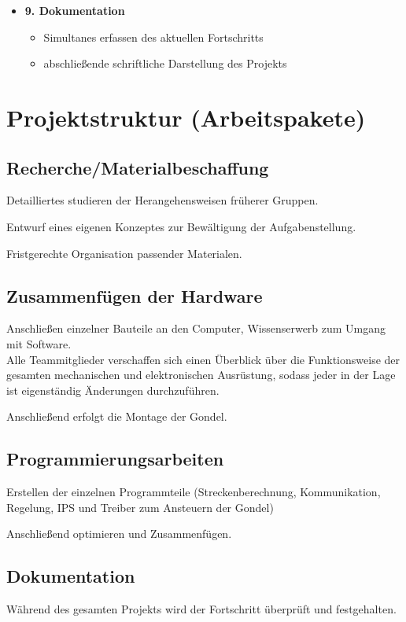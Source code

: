 \documentclass[lang=ngerman,inputenc=utf8,fontsize=10pt]{ldvarticle}
\begin{document}
\begin{itemize}
\begin{itemize}
\end{itemize}
\item \textbf{9. Dokumentation}
\begin{itemize}
\item Simultanes erfassen des aktuellen Fortschritts
\item abschließende schriftliche Darstellung des Projekts
\end{itemize}


\end{itemize}

\section{Projektstruktur (Arbeitspakete)}


\subsection*{Recherche/Materialbeschaffung}

Detailliertes studieren der Herangehensweisen früherer Gruppen.

Entwurf eines eigenen Konzeptes zur Bewältigung der Aufgabenstellung.

Fristgerechte Organisation passender Materialen.
 

\subsection*{Zusammenfügen der Hardware}

Anschließen einzelner Bauteile an den Computer, Wissenserwerb zum Umgang mit Software.\\
Alle Teammitglieder verschaffen sich einen Überblick über die Funktionsweise der gesamten mechanischen und elektronischen Ausrüstung, sodass jeder in der Lage ist eigenständig Änderungen durchzuführen.

Anschließend erfolgt die Montage der Gondel.

\subsection*{Programmierungsarbeiten}

Erstellen der einzelnen Programmteile (Streckenberechnung, Kommunikation, Regelung, IPS und Treiber zum Ansteuern der Gondel)

Anschließend optimieren und Zusammenfügen.



\subsection*{Dokumentation}
Während des gesamten Projekts wird der Fortschritt überprüft und festgehalten.
\end{document}
